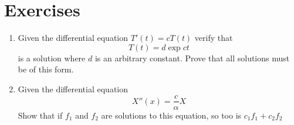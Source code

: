 \documentclass[book.tex]{subfiles}
\begin{document}

\section{Exercises}
\begin{enumerate}
    \item Given the differential equation $T'(t) = cT(t)$ verify that 
    \begin{equation}
        T(t) = d \exp{ct}
    \end{equation}
    is a solution where $d$ is an arbitrary constant. Prove that all solutions must be of this form.
    \item Given the differential equation
    \begin{equation}
        X''(x) = \frac{c}{\alpha} X
    \end{equation}
    Show that if $f_1$ and $f_2$ are solutions to this equation, so too is $c_1 f_1 + c_2 f_2$
\end{enumerate}
\end{document}
